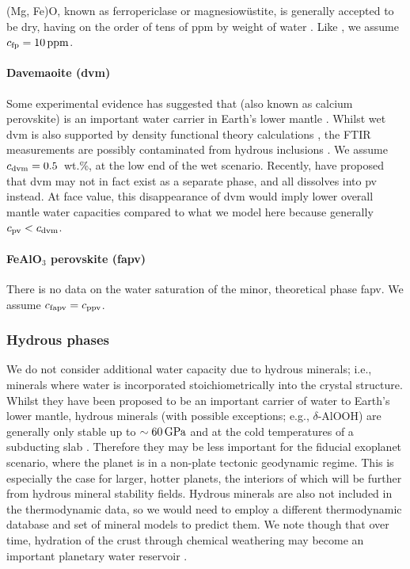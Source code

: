 (Mg, Fe)O, known as ferropericlase or magnesiow\"ustite, is generally accepted to be dry, having on the order of tens of ppm by weight of water \citep{bolfan-casanova_pressure_2002, litasov_influence_2010}. Like \citet{dong_constraining_2021}, we assume $c_{\rm fp} = 10\,{\rm ppm}$.

\paragraph{Davemaoite (dvm)}

Some experimental evidence has suggested that  (also known as calcium perovskite) is an important water carrier in Earth's lower mantle \citep{chen_possible_2020}. Whilst wet dvm is also supported by density functional theory calculations \citep{shim_water_2022}, the FTIR measurements are possibly contaminated from hydrous inclusions \citep{chen_possible_2020}. We assume $c_{\rm dvm} = 0.5$~wt.\%, at the low end of the wet scenario. Recently, \citet{ko_calcium_2022} have proposed that dvm may not in fact exist as a separate phase, and all  dissolves into pv instead. At face value, this disappearance of dvm would imply lower overall mantle water capacities compared to what we model here because generally $c_{\rm pv} < c_{\rm dvm}$.

\paragraph{FeAlO$_3$ perovskite (fapv)}

There is no data on the water saturation of the minor, theoretical phase fapv. We assume $c_{\rm fapv} = c_{\rm ppv}$.



\subsubsection{Hydrous phases}

We do not consider additional water capacity due to hydrous minerals; i.e., minerals where water is incorporated stoichiometrically into the crystal structure. Whilst they have been proposed to be an important carrier of water to Earth's lower mantle, hydrous minerals (with possible exceptions; e.g., $\delta$-AlOOH) are generally only stable up to $\sim60\,{\rm GPa}$ and at the cold temperatures of a subducting slab \citep{ohtani_hydrous_2015}. Therefore they may be less important for the fiducial exoplanet scenario, where the planet is in a non-plate tectonic geodynamic regime. This is especially the case for larger, hotter planets, the interiors of which will be further from hydrous mineral stability fields. Hydrous minerals are also not included in the \citet{stixrude_thermal_2022} thermodynamic data, so we would need to employ a different thermodynamic database and set of mineral models to predict them. We note though that over time, hydration of the crust through chemical weathering may become an important planetary water reservoir \citep[e.g.,][]{scheller_longterm_2021}.

